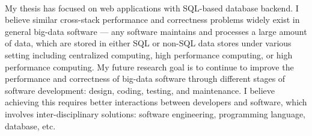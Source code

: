 

\paragraph{}My thesis has focused on web applications with SQL-based database backend.  I believe similar cross-stack performance and correctness problems widely exist in general big-data software --- any software  maintains and processes a large amount of data, which are stored in either SQL or non-SQL data stores under various setting including centralized computing, high performance computing, or high performance computing. My future research goal is to continue to improve the performance and correctness of big-data software through different stages of software development: design, coding, testing, and maintenance. I believe achieving this requires better interactions between developers and software, which involves inter-disciplinary solutions: software engineering, programming language, database, etc. 

